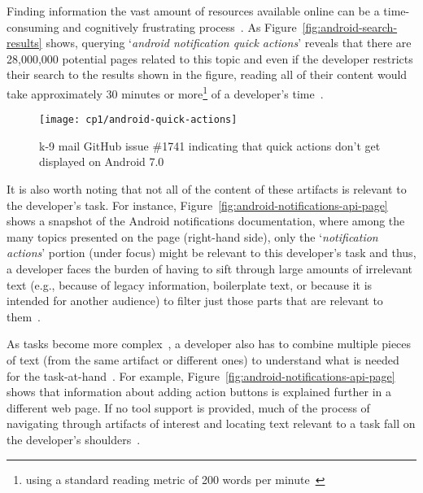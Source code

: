 



Finding information the vast amount of resources available online can be a time-consuming
and cognitively frustrating process~\cite{Begel2008,
robillard2011field}. 
As Figure~\ref{fig:android-search-results} shows, querying `\textit{android notification quick actions}'
reveals that there are 28,000,000 potential pages related to this topic
and even if the developer restricts their search to the results shown in the figure, reading all of their content would take approximately 30 minutes or more\footnote{using a standard reading metric of 200 words per minute~\cite{Just1980}} of a developer's time~\cite{endrikat2014, Meyer2017}. 


\begin{figure}
    \centering
    \texttt{[image: cp1/android-quick-actions]}
    \caption{k-9 mail GitHub issue \#1741 indicating that quick actions don't get displayed on Android 7.0}
    \label{fig:android-notifications-task}
\end{figure}



It is also worth noting that not all of the content of these artifacts is relevant to the developer's task. 
For instance, Figure~\ref{fig:android-notifications-api-page} shows a snapshot 
of the Android notifications documentation, where among  
the many topics presented on the page (right-hand side), only the `\textit{notification actions}' portion (under focus) might be relevant to this developer's task
and thus, a developer 
faces the burden of having to sift through large amounts of
irrelevant text (e.g., because of legacy information, boilerplate text, or because it is intended for another audience) to filter just those parts that are relevant to them~\cite{Robillard2015}. 


As tasks become more complex~\cite{Pirolli2007, Bystrom1995}, a developer also has to combine multiple pieces of text (from the same artifact or different ones) to understand what is needed for the task-at-hand~\cite{Piorkowski2016}. For example, Figure~\ref{fig:android-notifications-api-page} shows that information about adding
action buttons is explained further in a different web page.
If no tool support is provided, much of the process of navigating through artifacts of interest and locating text 
relevant to a task fall on the developer's shoulders~\cite{gonccalves2011, Ko2006a, Bystrom1995}.






